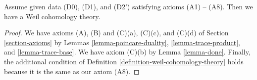 \begin{proposition}
\label{proposition-get-weil}
Assume given data (D0), (D1), and (D2') satisfying axioms (A1) -- (A8).
Then we have a Weil cohomology theory.
\end{proposition}

\begin{proof}
We have axioms (A), (B) and (C)(a), (C)(c), and (C)(d) of
Section \ref{section-axioms} by
Lemmas \ref{lemma-poincare-duality}, \ref{lemma-trace-product}, and
\ref{lemma-trace-base}.
We have axiom (C)(b) by
Lemma \ref{lemma-done}.
Finally, the additional condition of
Definition \ref{definition-weil-cohomology-theory}
holds because it is the same as our axiom (A8).
\end{proof}


















